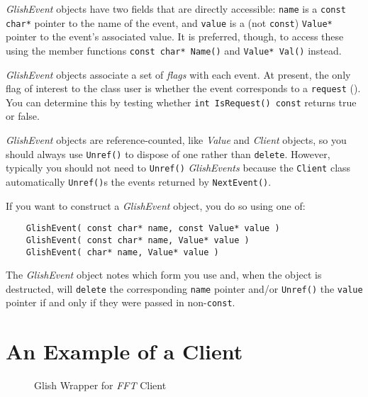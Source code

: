 {\em GlishEvent} objects have two fields that are directly accessible:
{\tt name} is a {\tt const char*} pointer to the name of the event, and
{\tt value} is a (not {\tt const}) {\tt Value*} pointer to the event's
associated value.  It is preferred, though, to access these using the
member functions {\tt const char* Name()} and
{\tt Value* Val()} instead.

{\em GlishEvent} objects associate a set of {\em flags} with each
event.  At present, the only flag of interest to the class user
is whether the event corresponds to a {\tt request} ().
You can determine this by testing whether {\tt int IsRequest() const} returns
true or false.

{\em GlishEvent} objects are reference-counted, like {\em Value} and
{\em Client} objects, so you should always use {\tt Unref()} to dispose
of one rather than {\tt delete}. However, typically you should not need
to {\tt Unref()} {\em GlishEvents} because the {\tt Client} class automatically
{\tt Unref()}s the events returned by {\tt NextEvent()}.

If you want to construct a {\em GlishEvent} object, you do so using one of:
\begin{verbatim}
    GlishEvent( const char* name, const Value* value )
    GlishEvent( const char* name, Value* value )
    GlishEvent( char* name, Value* value )
\end{verbatim}
The {\em GlishEvent} object notes which form you use and, when the object
is destructed, will {\tt delete} the corresponding {\tt name} pointer
and/or {\tt Unref()} the {\tt value} pointer if and only if they were
passed in non-{\tt{}const}.  

\section{An Example of a Client}


\begin{figure*}[tp]
\begin{footnotesize}
\begin{tgrind}[c]

\end{tgrind}
\end{footnotesize}
\caption{Glish Wrapper for {\em FFT} Client}
\label{fft}
\end{figure*}

